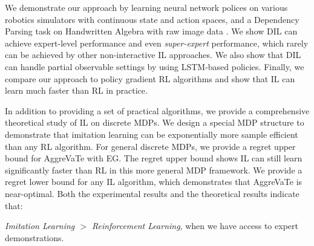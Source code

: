 We demonstrate our approach by learning neural network polices on various robotics simulators with continuous state and action spaces, and a Dependency Parsing task on Handwritten Algebra with raw image data \cite{duyckpredicting}. We show DIL can achieve expert-level performance and even \emph{super-expert} performance, which rarely can be achieved by other non-interactive IL approaches. We also show that DIL can handle partial observable settings by using LSTM-based policies. Finally, we compare our approach to policy gradient RL algorithms and show that IL can learn much faster than RL in practice. 

In addition to providing a set of practical algorithms, we provide a comprehensive  theoretical study of IL on discrete MDPs. We design a special MDP structure to demonstrate that imitation learning can be exponentially more sample efficient than any RL algorithm.  For general discrete MDPs, we provide a regret upper bound for AggreVaTe with EG. The regret upper bound shows IL can still learn significantly faster than RL in this more general MDP framework. We provide a regret lower bound for any IL algorithm, which demonstrates that AggreVaTe is near-optimal. Both the experimental results and the theoretical results indicate that: 
\begin{displayquote}
\emph{Imitation Learning $>$ Reinforcement Learning}, when we have access to expert demonstrations.
\end{displayquote}

